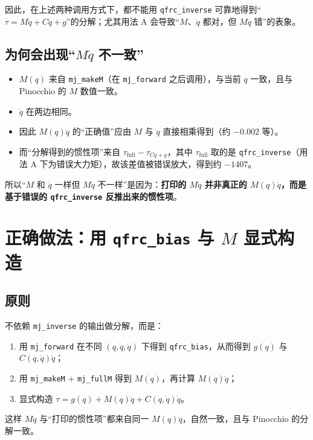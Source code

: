 \documentclass[12pt,a4paper]{article}
\begin{document}
因此，在上述两种调用方式下，都不能用 \texttt{qfrc\_inverse} 可靠地得到“$\tau = M\ddot{q} + C\dot{q} + g$”的分解；尤其用法 A 会导致“$M$、$\ddot{q}$ 都对，但 $M\ddot{q}$ 错”的表象。

\subsection{为何会出现“$M\ddot{q}$ 不一致”}

\begin{itemize}[leftmargin=*]
  \item $M(q)$ 来自 \texttt{mj\_makeM}（在 \texttt{mj\_forward} 之后调用），与当前 $q$ 一致，且与 Pinocchio 的 $M$ 数值一致。
  \item $\ddot{q}$ 在两边相同。
  \item 因此 $M(q)\ddot{q}$ 的“正确值”应由 $M$ 与 $\ddot{q}$ 直接相乘得到（约 $-0.002$ 等）。
  \item 而“分解得到的惯性项”来自 $\tau_{\mathrm{full}} - \tau_{C\dot{q}+g}$，其中 $\tau_{\mathrm{full}}$ 取的是 \texttt{qfrc\_inverse}（用法 A 下为错误大力矩），故该差值被错误放大，得到约 $-1407$。
\end{itemize}

所以“$M$ 和 $\ddot{q}$ 一样但 $M\ddot{q}$ 不一样”是因为：\textbf{打印的 $M\ddot{q}$ 并非真正的 $M(q)\ddot{q}$，而是基于错误的 \texttt{qfrc\_inverse} 反推出来的惯性项}。

\section{正确做法：用 \texttt{qfrc\_bias} 与 $M$ 显式构造}

\subsection{原则}

不依赖 \texttt{mj\_inverse} 的输出做分解，而是：
\begin{enumerate}[leftmargin=*]
  \item 用 \texttt{mj\_forward} 在不同 $(q,\dot{q},\ddot{q})$ 下得到 \texttt{qfrc\_bias}，从而得到 $g(q)$ 与 $C(q,\dot{q})\dot{q}$；
  \item 用 \texttt{mj\_makeM} + \texttt{mj\_fullM} 得到 $M(q)$，再计算 $M(q)\ddot{q}$；
  \item 显式构造 $\tau = g(q) + M(q)\ddot{q} + C(q,\dot{q})\dot{q}$。
\end{enumerate}

这样 $M\ddot{q}$ 与“打印的惯性项”都来自同一 $M(q)\ddot{q}$，自然一致，且与 Pinocchio 的分解一致。
\end{document}
